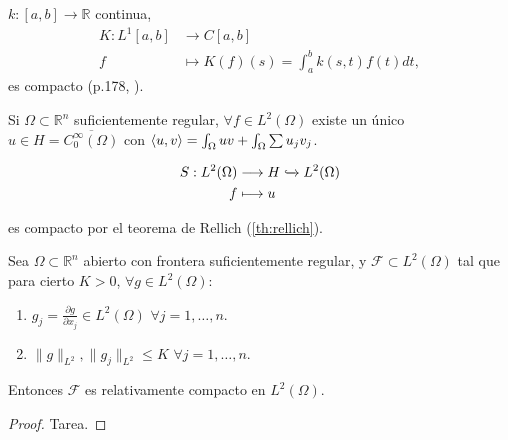 \begin{example}
  $k:[a,b]\to \mathbb{R}$ continua,
  \begin{align*}
    K: L^1[a,b] &\longrightarrow C[a,b] \\
    f &\longmapsto K(f)(s) = \int_{a}^{b} k(s,t)f(t)dt 
  ,\end{align*}
  es compacto (p.178, \cite{cascales2012}).
\end{example}

\begin{example}
  Si $\Omega\subset \mathbb{R}^n$ suficientemente regular, $\forall f\in
  L^2(\Omega)$ existe un único $u\in H=\overline{C_0^\infty(\Omega)}$ con
  $\left\langle u,v\right\rangle=\int_\Omega uv + \int_\Omega \sum u_jv_j$.

  \begin{align*}
    S: L^2(\Omega) &\longrightarrow H \xhookrightarrow{} L^2(\Omega) \\
     f&\longmapsto u 
  \end{align*}

  es compacto por el teorema de Rellich (\ref{th:rellich}).
\end{example}

\begin{theorem}[Rellich]
  \label{th:rellich}
  Sea $\Omega\subset \mathbb{R}^n$ abierto con frontera suficientemente regular,
  y $\mathcal{F}\subset L^2(\Omega)$ tal que para cierto $K>0$, $\forall g\in
  L^2(\Omega)$:
  \begin{enumerate}
    \item $g_j=\frac{\partial g}{\partial x_j} \in L^2(\Omega)$ $\forall
      j=1,\ldots,n$.
    \item $\|g\|_{L^2},\|g_j\|_{L^2}\le K$ $\forall j=1,\ldots,n$.
  \end{enumerate}

  Entonces $\mathcal{F}$ es relativamente compacto en $L^2(\Omega)$.
\end{theorem}
\begin{proof}
  Tarea.
\end{proof}

